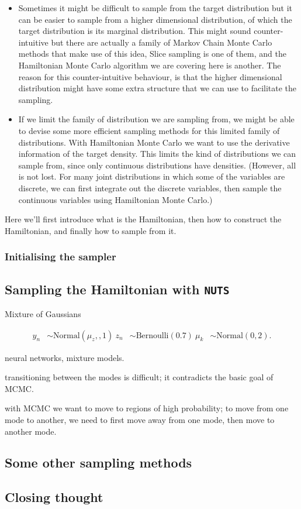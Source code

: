 \documentclass[11pt]{article}
\begin{document}
\begin{itemize}
\item Sometimes it might be difficult to sample from the target distribution
but it can be easier to sample from a higher dimensional distribution,
of which the target distribution is its marginal distribution. This
might sound counter-intuitive but there are actually a family of
Markov Chain Monte Carlo methods that make use of this idea, Slice
sampling is one of them, and the Hamiltonian Monte Carlo algorithm we
are covering here is another. The reason for this counter-intuitive
behaviour, is that the higher dimensional distribution might have some
extra structure that we can use to facilitate the sampling.
\item If we limit the family of distribution we are sampling from, we might
be able to devise some more efficient sampling methods for this
limited family of distributions. With Hamiltonian Monte Carlo we want
to use the derivative information of the target density. This limits
the kind of distributions we can sample from, since only continuous
distributions have densities. (However, all is not lost. For many
joint distributions in which some of the variables are discrete, we
can first integrate out the discrete variables, then sample the
continuous variables using Hamiltonian Monte Carlo.)
\end{itemize}

Here we'll first introduce what is the Hamiltonian, then how to
construct the Hamiltonian, and finally how to sample from it.

\subsubsection{Initialising the sampler}
\label{initialising-the-sampler}

\subsection{Sampling the Hamiltonian with \texttt{NUTS}}
\label{sec:orgdf1211f}
Mixture of Gaussians

\begin{align*} y_n &\sim \text{Normal}(\mu_{z}, , 1) \ z_{n} &\sim
\text{Bernoulli}(0.7) \ \mu_{k} &\sim \text{Normal}(0, 2). \end{align*}

neural networks, mixture models.

transitioning between the modes is difficult; it contradicts the basic
goal of MCMC.

with MCMC we want to move to regions of high probability; to move from
one mode to another, we need to first move away from one mode, then move
to another mode.

\subsection{Some other sampling methods}
\label{sec:org824dca6}

\subsection{Closing thought}
\label{sec:orgdba570c}
\end{document}
